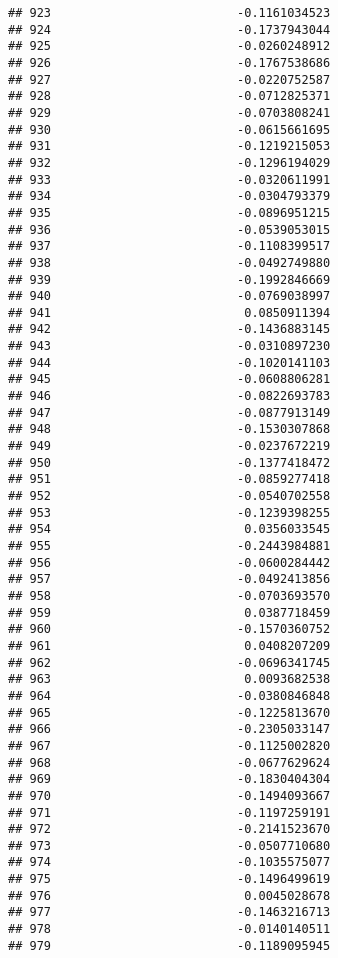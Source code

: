 \documentclass[
]{article}
\begin{document}
\begin{verbatim}
## 923                          -0.1161034523
## 924                          -0.1737943044
## 925                          -0.0260248912
## 926                          -0.1767538686
## 927                          -0.0220752587
## 928                          -0.0712825371
## 929                          -0.0703808241
## 930                          -0.0615661695
## 931                          -0.1219215053
## 932                          -0.1296194029
## 933                          -0.0320611991
## 934                          -0.0304793379
## 935                          -0.0896951215
## 936                          -0.0539053015
## 937                          -0.1108399517
## 938                          -0.0492749880
## 939                          -0.1992846669
## 940                          -0.0769038997
## 941                           0.0850911394
## 942                          -0.1436883145
## 943                          -0.0310897230
## 944                          -0.1020141103
## 945                          -0.0608806281
## 946                          -0.0822693783
## 947                          -0.0877913149
## 948                          -0.1530307868
## 949                          -0.0237672219
## 950                          -0.1377418472
## 951                          -0.0859277418
## 952                          -0.0540702558
## 953                          -0.1239398255
## 954                           0.0356033545
## 955                          -0.2443984881
## 956                          -0.0600284442
## 957                          -0.0492413856
## 958                          -0.0703693570
## 959                           0.0387718459
## 960                          -0.1570360752
## 961                           0.0408207209
## 962                          -0.0696341745
## 963                           0.0093682538
## 964                          -0.0380846848
## 965                          -0.1225813670
## 966                          -0.2305033147
## 967                          -0.1125002820
## 968                          -0.0677629624
## 969                          -0.1830404304
## 970                          -0.1494093667
## 971                          -0.1197259191
## 972                          -0.2141523670
## 973                          -0.0507710680
## 974                          -0.1035575077
## 975                          -0.1496499619
## 976                           0.0045028678
## 977                          -0.1463216713
## 978                          -0.0140140511
## 979                          -0.1189095945

\end{verbatim}
\end{document}
